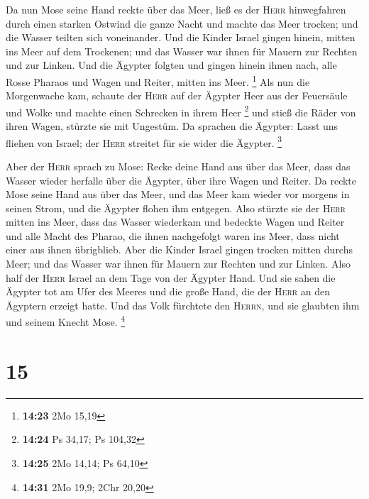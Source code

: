  Da nun Mose seine Hand reckte über das Meer, ließ es der
\textsc{Herr} hinwegfahren durch einen starken Ostwind die ganze Nacht
und machte das Meer trocken; und die Wasser teilten sich voneinander.
 Und die Kinder Israel gingen hinein, mitten ins Meer auf
dem Trockenen; und das Wasser war ihnen für Mauern zur Rechten und zur
Linken.  Und die Ägypter folgten und gingen hinein ihnen
nach, alle Rosse Pharaos und Wagen und Reiter, mitten ins Meer.
\footnote{\textbf{14:23} 2Mo 15,19}  Als nun die
Morgenwache kam, schaute der \textsc{Herr} auf der Ägypter Heer aus der
Feuersäule und Wolke und machte einen Schrecken in ihrem Heer
\footnote{\textbf{14:24} Ps 34,17; Ps 104,32}  und stieß
die Räder von ihren Wagen, stürzte sie mit Ungestüm. Da sprachen die
Ägypter: Lasst uns fliehen von Israel; der \textsc{Herr} streitet für
sie wider die Ägypter. \footnote{\textbf{14:25} 2Mo 14,14; Ps 64,10}

 Aber der \textsc{Herr} sprach zu Mose: Recke deine Hand
aus über das Meer, dass das Wasser wieder herfalle über die Ägypter,
über ihre Wagen und Reiter.  Da reckte Mose seine Hand
aus über das Meer, und das Meer kam wieder vor morgens in seinen Strom,
und die Ägypter flohen ihm entgegen. Also stürzte sie der \textsc{Herr}
mitten ins Meer,  dass das Wasser wiederkam und bedeckte
Wagen und Reiter und alle Macht des Pharao, die ihnen nachgefolgt waren
ins Meer, dass nicht einer aus ihnen übrigblieb.  Aber
die Kinder Israel gingen trocken mitten durchs Meer; und das Wasser war
ihnen für Mauern zur Rechten und zur Linken.  Also half
der \textsc{Herr} Israel an dem Tage von der Ägypter Hand. Und sie sahen
die Ägypter tot am Ufer des Meeres  und die große Hand,
die der \textsc{Herr} an den Ägyptern erzeigt hatte. Und das Volk
fürchtete den \textsc{Herrn}, und sie glaubten ihm und seinem Knecht
Mose. \footnote{\textbf{14:31} 2Mo 19,9; 2Chr 20,20}

\hypertarget{section-3}{%
\section{15}\label{section-3}}

